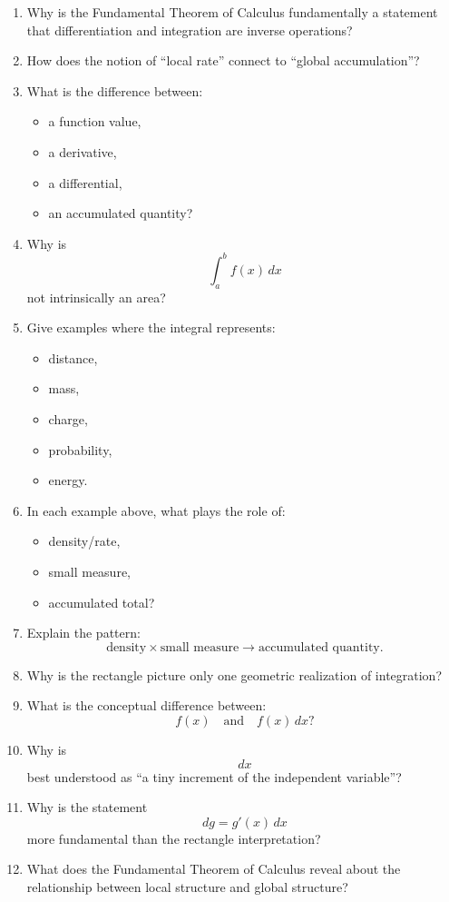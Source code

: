 \begin{enumerate}[resume]
    \[
      A'(x)=f(x)
    \]
    connect the area interpretation to the antiderivative interpretation?
  \item Why is the Fundamental Theorem of Calculus fundamentally a statement that differentiation and integration are inverse operations?
  \item How does the notion of ``local rate'' connect to ``global accumulation''?
  \item What is the difference between:
    \begin{itemize}
      \item a function value,
      \item a derivative,
      \item a differential,
      \item an accumulated quantity?
    \end{itemize}
  \item Why is
    \[
      \int_a^b f(x)\,dx
    \]
    not intrinsically an area?
  \item Give examples where the integral represents:
    \begin{itemize}
      \item distance,
      \item mass,
      \item charge,
      \item probability,
      \item energy.
    \end{itemize}
  \item In each example above, what plays the role of:
    \begin{itemize}
      \item density/rate,
      \item small measure,
      \item accumulated total?
    \end{itemize}
  \item Explain the pattern:
    \[
      \text{density} \times \text{small measure}
      \to
      \text{accumulated quantity}.
    \]
  \item Why is the rectangle picture only one geometric realization of integration?
  \item What is the conceptual difference between:
    \[
      f(x)
      \quad \text{and} \quad
      f(x)\,dx?
    \]
  \item Why is
    \[
      dx
    \]
    best understood as ``a tiny increment of the independent variable''?
  \item Why is the statement
    \[
      dg=g'(x)\,dx
    \]
    more fundamental than the rectangle interpretation?
  \item What does the Fundamental Theorem of Calculus reveal about the relationship between local structure and global structure?
\end{enumerate}

